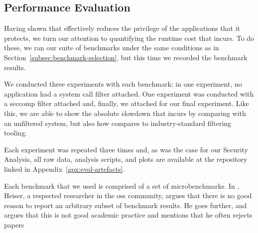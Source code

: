 \subsection{Performance Evaluation}\label{subsec:perf-eval}

Having shown that \af effectively reduces the privilege of the applications that
it protects, we turn our attention to quantifying the runtime cost that \af
incurs. To do these, we ran our suite of benchmarks under the same
conditions as in Section~\ref{subsec:benchmark-selection}, but this time we
recorded the benchmark results. 

We conducted three experiments with each benchmark: in one experiment, no
application had a system call filter attached. One experiment was conducted with
a seccomp filter attached and, finally, we attached \af for our final
experiment. Like this, we are able to show the absolute slowdown that \af
incurs by comparing with an unfiltered system, but also how \af compares to
industry-standard filtering tooling.

Each experiment was repeated three times and, as was the case for our Security
Analysis, all raw data, analysis scripts, and plots are available at the
repository linked in Appendix~\ref{apx:eval-artefacts}.

Each benchmark that we used is comprised of a set of microbenchmarks. In
\textcite{HeiserBenchmarkingCrimes}, Heiser, a respected researcher in the
\acp{os} community, argues that there is no good reason to report an arbitrary
subset of benchmark results. He goes further, and argues that this is not good
academic practice and mentions that he often rejects papers

